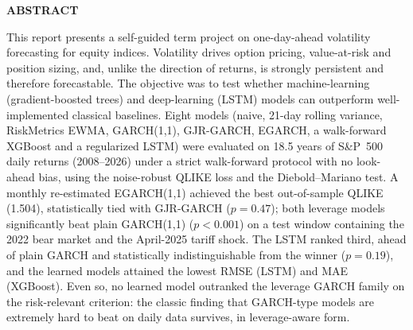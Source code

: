 \documentclass[a4paper,twocolumn,10pt]{article}
\begin{document}

\begin{center}\textbf{ABSTRACT}\end{center}
\noindent
This report presents a self-guided term project on one-day-ahead volatility forecasting for equity indices. Volatility drives option pricing, value-at-risk and position sizing, and, unlike the direction of returns, is strongly persistent and therefore forecastable. The objective was to test whether machine-learning (gradient-boosted trees) and deep-learning (LSTM) models can outperform well-implemented classical baselines. Eight models (naive, 21-day rolling variance, RiskMetrics EWMA, GARCH(1,1), GJR-GARCH, EGARCH, a walk-forward XGBoost and a regularized LSTM) were evaluated on 18.5 years of S\&P~500 daily returns (2008--2026) under a strict walk-forward protocol with no look-ahead bias, using the noise-robust QLIKE loss and the Diebold–Mariano test. A monthly re-estimated EGARCH(1,1) achieved the best out-of-sample QLIKE (1.504), statistically tied with GJR-GARCH ($p=0.47$); both leverage models significantly beat plain GARCH(1,1) ($p<0.001$) on a test window containing the 2022 bear market and the April-2025 tariff shock. The LSTM ranked third, ahead of plain GARCH and statistically indistinguishable from the winner ($p=0.19$), and the learned models attained the lowest RMSE (LSTM) and MAE (XGBoost). Even so, no learned model outranked the leverage GARCH family on the risk-relevant criterion: the classic finding that GARCH-type models are extremely hard to beat on daily data survives, in leverage-aware form.
\end{document}
